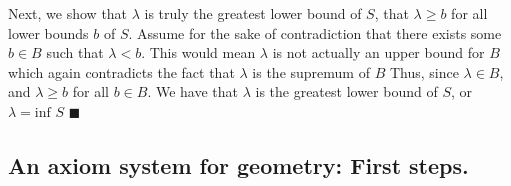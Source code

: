 \documentclass{report}
\begin{document}
\begin{itemize}
            \bigbreak \noindent 
            Next, we show that $\lambda$ is truly the greatest lower bound of $S$, that $\lambda \geq b $ for all lower bounds $b$ of $S$. Assume for the sake of contradiction that there exists some $b \in B$ such that $\lambda < b$. This would mean $\lambda$ is not actually an upper bound for $B$  which again contradicts the fact that $\lambda$ is the supremum of $B$
            \bigbreak \noindent 
            Thus, since $\lambda \in B$, and $\lambda \geq b$ for all $b\in B$. We have that $\lambda$ is the greatest lower bound of $S$, or $\lambda = \text{inf } S $ \hspace*{\fill}$\blacksquare$


    \end{itemize}

    \pagebreak 
    \subsection{An axiom system for geometry: First steps.}
\end{document}
